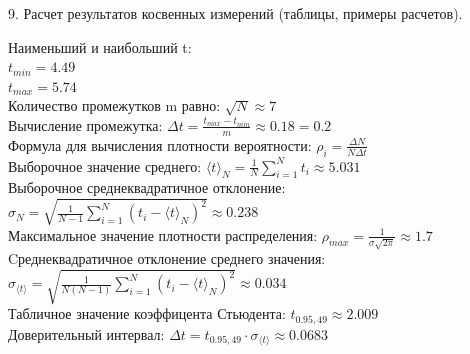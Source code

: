 \documentclass[12pt]{article}
\begin{document}
\begin{flushleft}
    9. Расчет результатов косвенных измерений (таблицы, примеры расчетов).
\end{flushleft}

\begin{flushleft}
    Наименьший и наибольший t: \\
    $ t_{min} = 4.49 $ \\
    $ t_{max} = 5.74 $ \\
    Количество промежутков m равно: $ \sqrt{N} \approx 7 $ \\
    Вычисление промежутка: $ \Delta t = \frac{t_{max} - t_{min}}{m} \approx 0.18 = 0.2 $ \\
    Формула для вычисления плотности вероятности: $ \rho_i = \frac{\Delta N}{N \Delta t} $ \\
    Выборочное значение среднего: $ \langle t \rangle _N = \frac{1}{N} \sum_{i=1}^{N}t_i \approx 5.031 $ \\
    Выборочное среднеквадратичное отклонение: $ \sigma_N = \sqrt{\frac{1}{N-1} \sum_{i=1}^{N} (t_i - \langle t \rangle_N)^2} \approx 0.238 $ \\
    Максимальное значение плотности распределения: $ \rho_{max} = \frac{1}{\sigma\sqrt{2\pi}} \approx 1.7 $ \\
    Cреднеквадратичное отклонение среднего значения: $ \sigma_{\langle t \rangle} = \sqrt{\frac{1}{N (N - 1)} \sum_{i=1}^{N} (t_i - \langle t \rangle_N)^2} \approx 0.034 $ \\
    Табличное значение коэффицента Стьюдента: $ t_{0.95,49} \approx 2.009 $ \\
    Доверительный интервал: $ \Delta t = t_{0.95,49} \cdot \sigma_{\langle t \rangle} \approx 0.0683 $ \\
\end{flushleft}
\end{document}
